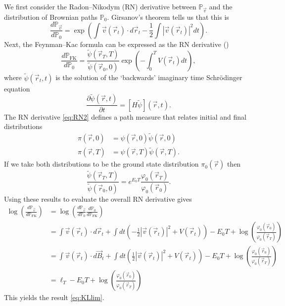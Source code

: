 \documentclass[12pt]{msml2020} %
\newcommand*{\bv}{\vec{v}}
\newcommand*{\br}{\vec{r}}
\begin{document}
We first consider the Radon--Nikodym (RN) derivative between $\mathbb{P}_{\bv}$ and the distribution of Brownian paths $\mathbb{P}_0$. Girsanov's theorem tells us that this is
%
\begin{equation}
  \frac{d\mathbb{P}_{\bv}}{d\mathbb{P}_0}=\exp\left(\int \bv(\br_t)\cdot d\br_t - \frac{1}{2}\int |\bv(\br_t)|^2 dt\right).
\end{equation}
%
Next, the Feynman--Kac formula can be expressed as the RN derivative (\cite{dai1990markov})
%
\begin{equation}\label{eq:RN2}
  \frac{d\mathbb{P}_\text{FK}}{d\mathbb{P}_0} = \frac{\tilde\psi(\vec{r}_T,T)}{\tilde\psi(\vec{r}_0,0)}\exp\left(-\int_{0}^{T} V(\vec{r}_t)dt\right),
\end{equation}
%
where $\tilde\psi(\vec{r}_t,t)$ is the solution of the `backwards' imaginary time Schr\"odinger equation
%
\begin{equation}
      \frac{\partial\tilde\psi(\vec{r},t)}{\partial t} = \left[H\tilde\psi\right](\vec{r},t).
\end{equation}
%
The RN derivative \eqref{eq:RN2} defines a path measure that relates initial and final distributions 
%
\begin{align}
    \pi(\br,0)&=\psi(\br,0)\tilde\psi(\br,0)\nonumber\\
    \pi(\br,T)&=\psi(\br,T)\tilde\psi(\br,T).
\end{align}
%
If we take both distributions to be the ground state distribution $\pi_0(\br)$ then
%
$$
\frac{\tilde\psi(\vec{r}_T,T)}{\tilde\psi(\vec{r}_0,0)}= e^{E_0T}\frac{\varphi_0(\vec{r}_T)}{\varphi_0(\vec{r}_0)}.
$$
%
Using these results to evaluate the overall RN derivative gives
%
\begin{align}\label{eq:RN-eval}
  \log\left(\frac{d\mathbb{P}_{\bv}}{d\mathbb{P}_\text{FK}}\right)&=\log\left(\frac{d\mathbb{P}_{\bv}}{d\mathbb{P}_0}\frac{d\mathbb{P}_0}{d\mathbb{P}_\text{FK}}\right)\nonumber\\
  &=\int \bv(\br_t)
  \cdot d\br_t+\int dt\left(-\frac{1}{2}|\bv(\br_t)|^2+V(\br_t)\right) - E_0 T + \log\left(\frac{\varphi_0(\vec{r}_0)}{\varphi_0(\vec{r}_T)}\right)\nonumber\\
  &=\int \bv(\br_t)
  \cdot d\vec{B}_t+\int dt\left(\frac{1}{2}|\bv(\br_t)|^2+V(\br_t)\right) - E_0 T + \log\left(\frac{\varphi_0(\vec{r}_0)}{\varphi_0(\vec{r}_T)}\right)\nonumber\\
  &=\ell_T - E_0 T + \log\left(\frac{\varphi_0(\vec{r}_0)}{\varphi_0(\vec{r}_T)}\right)
\end{align}
%
This yields the result \eqref{eq:KLlim}.
\end{document}
